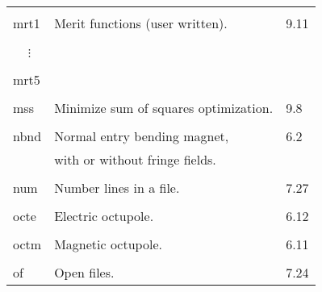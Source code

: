 \begin{center}
\begin{tabular}{lll}
\vspace{-3mm}& &\\
\hspace{1.5em}mrt1    &  Merit functions (user written).   &  \hspace{2em}9.11\\
\vspace{-7mm}& &\\
\hspace{1.5em}\ \ \,$\vdots$ & &\\
\vspace{-7mm}& &\\
\hspace{1.5em}mrt5 & &\\
\vspace{-3mm}& &\\
\hspace{1.5em}mss  &  Minimize sum of squares optimization. & \hspace{2em}9.8\\
\vspace{-3mm}& &\\
\hspace{1.5em}nbnd    &   Normal entry bending magnet,    &  \hspace{2em}6.2 \\
               &             with or without fringe fields.  &      \\
\vspace{-3mm}& &\\
 \hspace{1.5em}num   &    Number lines in a file.      & \hspace{2em}7.27\\
\vspace{-3mm}& &\\
\hspace{1.5em}octe    &     Electric octupole.            &  \hspace{2em}6.12\\
\vspace{-3mm}& &\\
\hspace{1.5em}octm    &   Magnetic octupole.            &  \hspace{2em}6.11\\
\vspace{-3mm}& &\\
\hspace{1.5em} of   &   Open files.                & \hspace{2em}7.24\\

\end{tabular}
\end{center}
